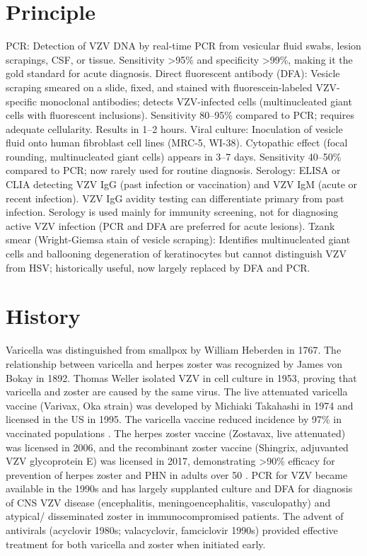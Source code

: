 \section*{Principle}
PCR: Detection of VZV DNA by real-time PCR from vesicular fluid swabs, lesion scrapings, CSF, or tissue. Sensitivity >95\% and specificity >99\%, making it the gold standard for acute diagnosis. Direct fluorescent antibody (DFA): Vesicle scraping smeared on a slide, fixed, and stained with fluorescein-labeled VZV-specific monoclonal antibodies; detects VZV-infected cells (multinucleated giant cells with fluorescent inclusions). Sensitivity 80--95\% compared to PCR; requires adequate cellularity. Results in 1--2 hours. Viral culture: Inoculation of vesicle fluid onto human fibroblast cell lines (MRC-5, WI-38). Cytopathic effect (focal rounding, multinucleated giant cells) appears in 3--7 days. Sensitivity 40--50\% compared to PCR; now rarely used for routine diagnosis. Serology: ELISA or CLIA detecting VZV IgG (past infection or vaccination) and VZV IgM (acute or recent infection). VZV IgG avidity testing can differentiate primary from past infection. Serology is used mainly for immunity screening, not for diagnosing active VZV infection (PCR and DFA are preferred for acute lesions). Tzank smear (Wright-Giemsa stain of vesicle scraping): Identifies multinucleated giant cells and ballooning degeneration of keratinocytes but cannot distinguish VZV from HSV; historically useful, now largely replaced by DFA and PCR.

\section*{History}
Varicella was distinguished from smallpox by William Heberden in 1767. The relationship between varicella and herpes zoster was recognized by James von Bokay in 1892. Thomas Weller isolated VZV in cell culture in 1953, proving that varicella and zoster are caused by the same virus. The live attenuated varicella vaccine (Varivax, Oka strain) was developed by Michiaki Takahashi in 1974 and licensed in the US in 1995. The varicella vaccine reduced incidence by 97\% in vaccinated populations \cite{marin2007prevention}. The herpes zoster vaccine (Zostavax, live attenuated) was licensed in 2006, and the recombinant zoster vaccine (Shingrix, adjuvanted VZV glycoprotein E) was licensed in 2017, demonstrating >90\% efficacy for prevention of herpes zoster and PHN in adults over 50 \cite{dooling2018recommendations}. PCR for VZV became available in the 1990s and has largely supplanted culture and DFA for diagnosis of CNS VZV disease (encephalitis, meningoencephalitis, vasculopathy) and atypical/ disseminated zoster in immunocompromised patients. The advent of antivirals (acyclovir 1980s; valacyclovir, famciclovir 1990s) provided effective treatment for both varicella and zoster when initiated early.

